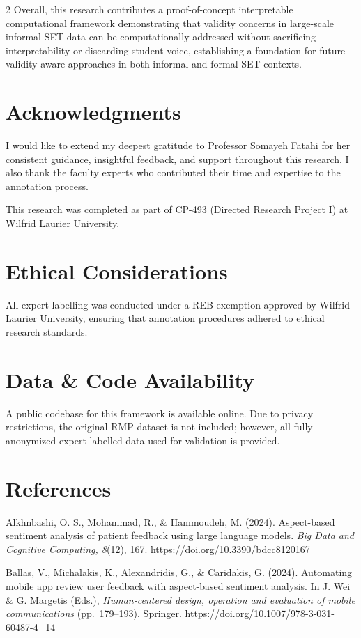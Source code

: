 \documentclass{article}
\begin{document}
\begin{multicols*}{2}
Overall, this research contributes a proof-of-concept interpretable computational framework demonstrating that validity concerns in large-scale informal SET data can be computationally addressed without sacrificing interpretability or discarding student voice, establishing a foundation for future validity-aware approaches in both informal and formal SET contexts.
\section{Acknowledgments}
I would like to extend my deepest gratitude to Professor Somayeh Fatahi for her consistent guidance, insightful feedback, and support throughout this research. I also thank the faculty experts who contributed their time and expertise to the annotation process. 

This research was completed as part of CP-493 (Directed Research Project I) at Wilfrid Laurier University.
\section{Ethical Considerations}
All expert labelling was conducted under a REB exemption approved by Wilfrid Laurier University, ensuring that annotation procedures adhered to ethical research standards.
\section{Data \& Code Availability}
A public codebase for this framework is available online. Due to privacy restrictions, the original RMP dataset is not included; however, all fully anonymized expert-labelled data used for validation is provided.
\section*{References} 
\begingroup
\scriptsize 
\setlength{\parskip}{9pt}
\noindent
Alkhnbashi, O. S., Mohammad, R., \& Hammoudeh, M. (2024). Aspect-based sentiment analysis of patient feedback using large language models. \textit{Big Data and Cognitive Computing, 8}(12), 167. \url{https://doi.org/10.3390/bdcc8120167}

Ballas, V., Michalakis, K., Alexandridis, G., \& Caridakis, G. (2024). Automating mobile app review user feedback with aspect-based sentiment analysis. In J. Wei \& G. Margetis (Eds.), \textit{Human-centered design, operation and evaluation of mobile communications} (pp.~179--193). Springer. \url{https://doi.org/10.1007/978-3-031-60487-4_14}


\end{multicols*}
\end{document}
